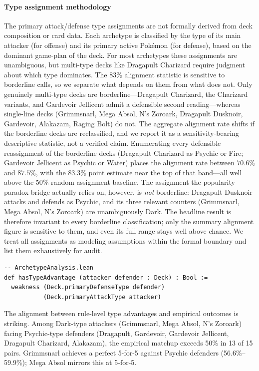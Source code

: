 \documentclass[journal]{IEEEtran}
\newif\ifhighlightchanges
\newcommand{\revised}[1]{\ifhighlightchanges\textcolor{blue!70!black}{#1}\else#1\fi}
\begin{document}
\paragraph{Type assignment methodology}
The primary attack/defense type assignments are not formally derived from deck composition or card data.
Each archetype is classified by the type of its main attacker (for offense) and its primary active Pok\'emon (for defense), based on the dominant game-plan of the deck.
For most archetypes these assignments are unambiguous, but multi-type decks like Dragapult Charizard require judgment about which type dominates.
\revised{The 83\% alignment statistic is sensitive to borderline calls, so we separate what depends on them from what does not.
Only genuinely multi-type decks are borderline---Dragapult Charizard, the Charizard variants, and Gardevoir Jellicent admit a defensible second reading---whereas single-line decks (Grimmsnarl, Mega Absol, N's Zoroark, Dragapult Dusknoir, Gardevoir, Alakazam, Raging Bolt) do not.
The aggregate alignment rate shifts if the borderline decks are reclassified, and we report it as a sensitivity-bearing descriptive statistic, not a verified claim.
\revised{Enumerating every defensible reassignment of the borderline decks (Dragapult Charizard as Psychic or Fire; Gardevoir Jellicent as Psychic or Water) places the alignment rate between $70.6\%$ and $87.5\%$, with the $83.3\%$ point estimate near the top of that band---all well above the $50\%$ random-assignment baseline.}
The assignment the popularity-paradox bridge actually relies on, however, is \emph{not} borderline: Dragapult Dusknoir attacks and defends as Psychic, and its three relevant counters (Grimmsnarl, Mega Absol, N's Zoroark) are unambiguously Dark.
The headline result is therefore invariant to every borderline classification; only the summary alignment figure is sensitive to them, and even its full range stays well above chance.
We treat all assignments as modeling assumptions within the formal boundary and list them exhaustively for audit.}

\begin{lstlisting}[caption={Rule-level type-advantage predicate.},label={lst:typeadv}]
-- ArchetypeAnalysis.lean
def hasTypeAdvantage (attacker defender : Deck) : Bool :=
  weakness (Deck.primaryDefenseType defender)
           (Deck.primaryAttackType attacker)
\end{lstlisting}

The alignment between rule-level type advantages and empirical outcomes is striking.
Among Dark-type attackers (Grimmsnarl, Mega Absol, N's Zoroark) facing Psychic-type defenders (Dragapult, Gardevoir, Gardevoir Jellicent, Dragapult Charizard, Alakazam), the empirical matchup exceeds 50\% in 13 of 15 pairs.
Grimmsnarl achieves a perfect 5-for-5 against Psychic defenders (56.6\%--59.9\%); Mega Absol mirrors this at 5-for-5.
\end{document}
